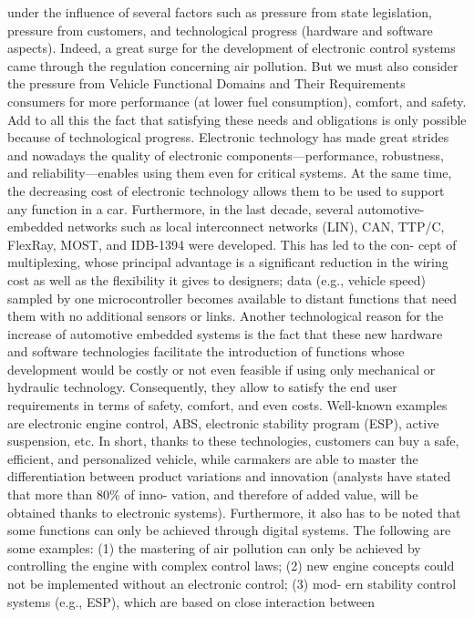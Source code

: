 under the influence of several factors such as pressure from state legislation, pressure
from customers, and technological progress (hardware and software aspects). Indeed,
a great surge for the development of electronic control systems came through the
regulation concerning air pollution. But we must also consider the pressure from
Vehicle Functional Domains and Their Requirements
consumers for more performance (at lower fuel consumption), comfort, and safety.
Add to all this the fact that satisfying these needs and obligations is only possible
because of technological progress.
Electronic technology has made great strides and nowadays the quality of electronic
components—performance, robustness, and reliability—enables using them even for
critical systems. At the same time, the decreasing cost of electronic technology allows
them to be used to support any function in a car. Furthermore, in the last decade,
several automotive-embedded networks such as local interconnect networks (LIN),
CAN, TTP/C, FlexRay, MOST, and IDB-1394 were developed. This has led to the con-
cept of multiplexing, whose principal advantage is a significant reduction in the wiring
cost as well as the flexibility it gives to designers; data (e.g., vehicle speed) sampled by
one microcontroller becomes available to distant functions that need them with no
additional sensors or links.
Another technological reason for the increase of automotive embedded systems is
the fact that these new hardware and software technologies facilitate the introduction
of functions whose development would be costly or not even feasible if using only
mechanical or hydraulic technology. Consequently, they allow to satisfy the end user
requirements in terms of safety, comfort, and even costs. Well-known examples are
electronic engine control, ABS, electronic stability program (ESP), active suspension,
etc. In short, thanks to these technologies, customers can buy a safe, efficient, and
personalized vehicle, while carmakers are able to master the differentiation between
product variations and innovation (analysts have stated that more than 80\% of inno-
vation, and therefore of added value, will be obtained thanks to electronic systems).
Furthermore, it also has to be noted that some functions can only be achieved through
digital systems. The following are some examples: (1) the mastering of air pollution
can only be achieved by controlling the engine with complex control laws; (2) new
engine concepts could not be implemented without an electronic control; (3) mod-
ern stability control systems (e.g., ESP), which are based on close interaction between
